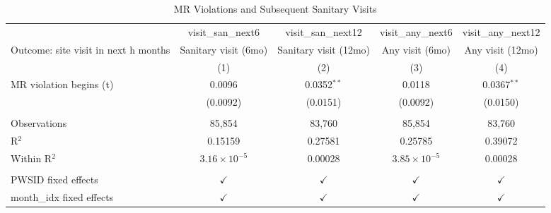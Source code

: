 
\begin{table}[htbp]
   
   \caption{\label{tab:mr_to_visit} MR Violations and Subsequent Sanitary Visits}
   \bigskip
   
   \centering
   
   \begin{adjustbox}{width = \textwidth, center}
      
      
      \begin{tabular}{lcccc}
         \toprule
         
                                              & visit\_san\_next6     & visit\_san\_next12    & visit\_any\_next6     & visit\_any\_next12\\    
         
         Outcome: site visit in next h months & Sanitary visit (6mo)  & Sanitary visit (12mo) & Any visit (6mo)       & Any visit (12mo) \\   
         
                                              & (1)                   & (2)                   & (3)                   & (4)\\  
         
         \midrule 
         MR violation begins (t)              & 0.0096                & 0.0352$^{**}$         & 0.0118                & 0.0367$^{**}$\\   
                                              & (0.0092)              & (0.0151)              & (0.0092)              & (0.0150)\\   
         
          \\
         
         Observations                         & 85,854                & 83,760                & 85,854                & 83,760\\  
         R$^2$                                & 0.15159               & 0.27581               & 0.25785               & 0.39072\\  
         Within R$^2$                         & $3.16\times 10^{-5}$  & 0.00028               & $3.85\times 10^{-5}$  & 0.00028\\  
         
          \\
         
         PWSID fixed effects                  & $\checkmark$          & $\checkmark$          & $\checkmark$          & $\checkmark$\\   
         month\_idx fixed effects             & $\checkmark$          & $\checkmark$          & $\checkmark$          & $\checkmark$\\   
         

\end{tabular}
\end{adjustbox}
\end{table}
